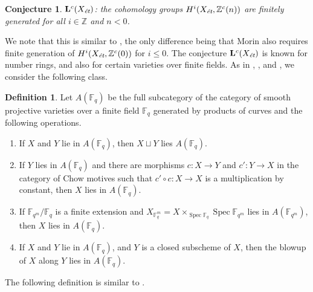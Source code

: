 \documentclass[leqno,12pt]{article}
\theoremstyle{plain}
\newtheorem{conjecture}[theorem]{\indent\sc Conjecture}
\theoremstyle{definition}
\newtheorem{definition}[theorem]{\indent\sc Definition}
\DeclareMathOperator{\Spec}{Spec}
\newcommand{\FF}{\mathbb{F}}
\newcommand{\ZZ}{\mathbb{Z}}
\newcommand{\et}{\text{\it \'{e}t}}
\begin{document}
\begin{conjecture}
  $\mathbf{L}^c (X_\et)$: the cohomology groups $H^i (X_\et, \ZZ^c (n))$ are
  finitely generated for all $i \in \ZZ$ and $n < 0$.
\end{conjecture}

We note that this is similar to \cite[Definition~5.8]{Morin-2014}, the only
difference being that Morin also requires finite generation of
$H^i (X_\et, \ZZ^c (0))$ for $i \le 0$.  The conjecture $\mathbf{L}^c (X_\et)$
is known for number rings, and also for certain varieties over finite fields. As
in \cite{Soule-1984}, \cite{Geisser-2004}, and \cite{Morin-2014}, we consider
the following class.

\begin{definition}
  Let $A (\FF_q)$ be the full subcategory of the category of smooth projective
  varieties over a finite field $\FF_q$ generated by products of curves and the
  following operations.
  \begin{enumerate}
  \item[1)] If $X$ and $Y$ lie in $A (\FF_q)$, then $X \sqcup Y$ lies
    $A (\FF_q)$.
  \item[2)] If $Y$ lies in $A (\FF_q)$ and there are morphisms $c\colon X\to Y$
    and $c'\colon Y\to X$ in the category of Chow motives such that
    $c'\circ c\colon X\to X$ is a multiplication by constant, then
    $X$ lies in $A (\FF_q)$.
  \item[3)] If $\FF_{q^m}/\FF_q$ is a finite extension and
    $X_{\FF_q^m} = X \times_{\Spec \FF_q} \Spec \FF_{q^m}$ lies in
    $A (\FF_{q^m})$, then $X$ lies in $A (\FF_q)$.
  \item[4)] If $X$ and $Y$ lie in $A (\FF_q)$, and $Y$ is a closed subscheme of
    $X$, then the blowup of $X$ along $Y$ lies in $A (\FF_q)$.
  \end{enumerate}
\end{definition}

The following definition is similar to \cite[Definition~5.9]{Morin-2014}.
\end{document}
